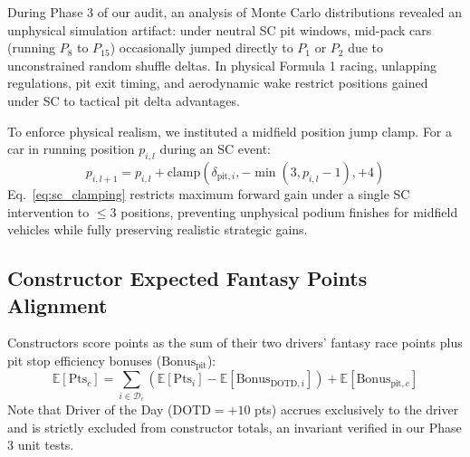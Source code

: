 During Phase 3 of our audit, an analysis of Monte Carlo distributions revealed an unphysical simulation artifact: under neutral SC pit windows, mid-pack cars (running $P_8$ to $P_{15}$) occasionally jumped directly to $P_1$ or $P_2$ due to unconstrained random shuffle deltas. In physical Formula 1 racing, unlapping regulations, pit exit timing, and aerodynamic wake restrict positions gained under SC to tactical pit delta advantages.

To enforce physical realism, we instituted a midfield position jump clamp. For a car in running position $p_{i, l}$ during an SC event:
\begin{equation}
p_{i, l+1} = p_{i, l} + \text{clamp}\left( \delta_{\text{pit}, i}, -\min(3, p_{i, l} - 1), +4 \right)
\label{eq:sc_clamping}
\end{equation}
Eq.~\eqref{eq:sc_clamping} restricts maximum forward gain under a single SC intervention to $\le 3$ positions, preventing unphysical podium finishes for midfield vehicles while fully preserving realistic strategic gains.

\subsection{Constructor Expected Fantasy Points Alignment}
Constructors score points as the sum of their two drivers' fantasy race points plus pit stop efficiency bonuses ($\text{Bonus}_{\text{pit}}$):
\begin{equation}
\mathbb{E}[\text{Pts}_c] = \sum_{i \in \mathcal{D}_c} \left( \mathbb{E}[\text{Pts}_i] - \mathbb{E}[\text{Bonus}_{\text{DOTD}, i}] \right) + \mathbb{E}[\text{Bonus}_{\text{pit}, c}]
\label{eq:constructor_ev}
\end{equation}
Note that Driver of the Day ($\text{DOTD} = +10$ pts) accrues exclusively to the driver and is strictly excluded from constructor totals, an invariant verified in our Phase 3 unit tests.
